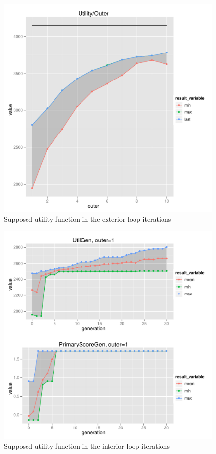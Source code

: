 \begin{figure}[tb]
  \centering \includegraphics[width=1.0\textwidth]{exp/nouncert/c2_utilouter}
  \caption{Supposed utility function in the exterior loop iterations}
  \label{c2_utilouter}
\end{figure}


\begin{figure}
  \centering \includegraphics[width=1.0\textwidth]{exp/nouncert/c2_utilgen_01}
  \caption{Supposed utility function in the interior loop iterations}
  \label{c2_utilgen_01}
\end{figure}

